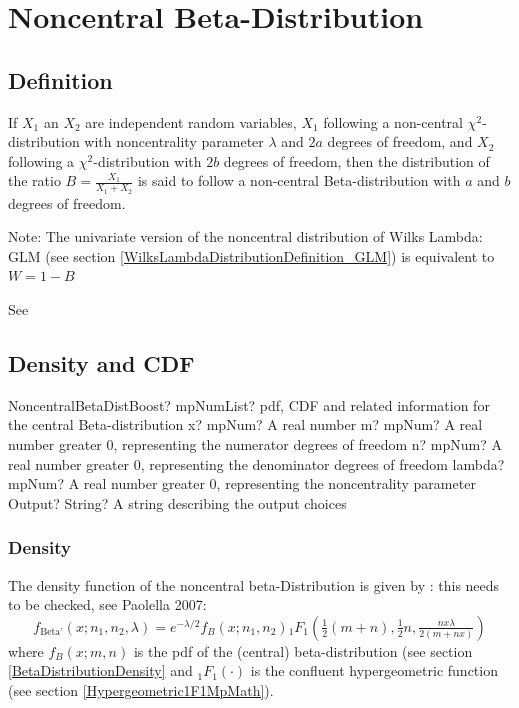 \newpage
\section{Noncentral Beta-Distribution}
\label{NoncentralBetaDistribution}


\subsection{Definition}
\label{NoncentralBetaDistributionDefinition}

If $X_1$ an $X_2$ are independent random variables, $X_1$  following a non-central $\chi^2$-distribution with noncentrality parameter $\lambda$ and $2a$ degrees of freedom, and  $X_2$  following a $\chi^2$-distribution with $2b$ degrees of freedom, then the distribution of the ratio $B=\frac{X_1}{X_1+X_2}$  is said to follow a non-central Beta-distribution with  $a$ and $b$  degrees of freedom.

Note: The univariate version of the noncentral distribution of Wilks Lambda: GLM 
(see section \ref{WilksLambdaDistributionDefinition_GLM}) 
is equivalent to $W=1-B$

See \cite{Tiwari_1997}



\subsection{Density and CDF}

\begin{mpFunctionsExtract}
	\mpFunctionFiveNotImplemented
	{NoncentralBetaDistBoost? mpNumList? pdf, CDF and related information for the central Beta-distribution}
	{x? mpNum? A real number}
	{m? mpNum? A real number greater 0, representing the numerator  degrees of freedom}
	{n? mpNum? A real number greater 0, representing the denominator degrees of freedom}
	{lambda? mpNum? A real number greater 0, representing the noncentrality parameter}
	{Output? String? A string describing the output choices}
\end{mpFunctionsExtract}



\subsubsection{Density}
\label{NoncentralBetaDistributionDensity}
The density function of the noncentral beta-Distribution is given by \citep{Wang1993}: this needs to be checked, see Paolella 2007:
\begin{equation}
	f_{\text{Beta'}}(x;n_1,n_2,\lambda) = e^{-\lambda/2} f_{B}(x;n_1,n_2) {}_1F_1 \left(\tfrac{1}{2}(m+n), \tfrac{1}{2}n, \tfrac{n x \lambda}{2(m+n x)}\right)
\end{equation}
where $f_{B}(x;m,n)$ is the pdf of the (central) beta-distribution (see section \ref{BetaDistributionDensity} and ${}_1F_1(\cdot)$ is the confluent hypergeometric function (see section \ref{Hypergeometric1F1MpMath}).



